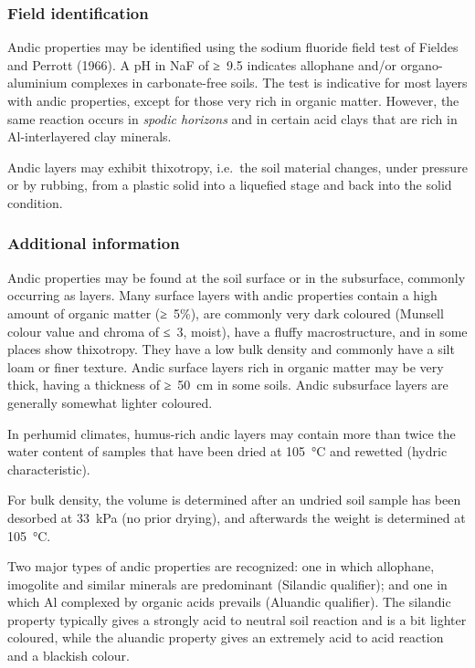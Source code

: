 \documentclass[
  letterpaper,
  DIV=11,
  numbers=noendperiod]{scrreprt}
\begin{document}
\hypertarget{field-identification-32}{%
\subsubsection{Field identification}\label{field-identification-32}}

Andic properties may be identified using the sodium fluoride field test
of Fieldes and Perrott (1966). A pH in NaF of ≥~9.5 indicates allophane
and/or organo-aluminium complexes in carbonate-free soils. The test is
indicative for most layers with andic properties, except for those very
rich in organic matter. However, the same reaction occurs in
\emph{spodic horizons} and in certain acid clays that are rich in
Al-interlayered clay minerals.

Andic layers may exhibit thixotropy, i.e.~the soil material changes,
under pressure or by rubbing, from a plastic solid into a liquefied
stage and back into the solid condition.

\hypertarget{additional-information-23}{%
\subsubsection{Additional information}\label{additional-information-23}}

Andic properties may be found at the soil surface or in the subsurface,
commonly occurring as layers. Many surface layers with andic properties
contain a high amount of organic matter (≥~5\%), are commonly very dark
coloured (Munsell colour value and chroma of ≤~3, moist), have a fluffy
macrostructure, and in some places show thixotropy. They have a low bulk
density and commonly have a silt loam or finer texture. Andic surface
layers rich in organic matter may be very thick, having a thickness of
≥~50~cm in some soils. Andic subsurface layers are generally somewhat
lighter coloured.

In perhumid climates, humus-rich andic layers may contain more than
twice the water content of samples that have been dried at 105~°C and
rewetted (hydric characteristic).

For bulk density, the volume is determined after an undried soil sample
has been desorbed at 33~kPa (no prior drying), and afterwards the weight
is determined at 105~°C.

Two major types of andic properties are recognized: one in which
allophane, imogolite and similar minerals are predominant (Silandic
qualifier); and one in which Al complexed by organic acids prevails
(Aluandic qualifier). The silandic property typically gives a strongly
acid to neutral soil reaction and is a bit lighter coloured, while the
aluandic property gives an extremely acid to acid reaction and a
blackish colour.
\end{document}
